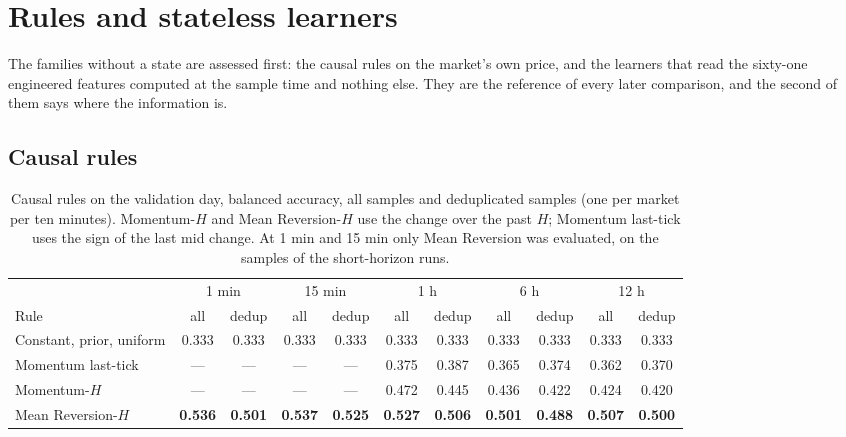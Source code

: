 \section{Rules and stateless learners}
\label{ch:stateless}

The families without a state are assessed first: the causal rules on the market's own
price, and the learners that read the sixty-one engineered features computed at the sample
time and nothing else.  They are the reference of every later comparison, and the second of
them says where the information is.

\subsection{Causal rules}
\label{sec:stateless:rules}
\label{sec:analysis:extreme}

\begin{table}[t]
\centering
\caption{Causal rules on the validation day, balanced accuracy, all samples and
deduplicated samples (one per market per ten minutes).  Momentum-$H$ and Mean
Reversion-$H$ use the change over the past $H$; Momentum last-tick uses the sign of the
last mid change.  At 1 min and 15 min only Mean Reversion was evaluated, on the samples of
the short-horizon runs.}
\label{tab:exp:baselines}
\small
\begin{fittable}\begin{tabular}{lcccccccccc}
\toprule
& \multicolumn{2}{c}{1 min} & \multicolumn{2}{c}{15 min} & \multicolumn{2}{c}{1 h} & \multicolumn{2}{c}{6 h} & \multicolumn{2}{c}{12 h} \\
\cmidrule(lr){2-3}\cmidrule(lr){4-5}\cmidrule(lr){6-7}\cmidrule(lr){8-9}\cmidrule(lr){10-11}
Rule & all & dedup & all & dedup & all & dedup & all & dedup & all & dedup \\
\midrule
Constant, prior, uniform  & 0.333 & 0.333 & 0.333 & 0.333 & 0.333 & 0.333 & 0.333 & 0.333 & 0.333 & 0.333 \\
Momentum last-tick        & --- & --- & --- & --- & 0.375 & 0.387 & 0.365 & 0.374 & 0.362 & 0.370 \\
Momentum-$H$              & --- & --- & --- & --- & 0.472 & 0.445 & 0.436 & 0.422 & 0.424 & 0.420 \\
Mean Reversion-$H$        & \textbf{0.536} & \textbf{0.501} & \textbf{0.537} & \textbf{0.525} & \textbf{0.527} & \textbf{0.506} & \textbf{0.501} & \textbf{0.488} & \textbf{0.507} & \textbf{0.500} \\
\bottomrule
\end{tabular}\end{fittable}
\end{table}

